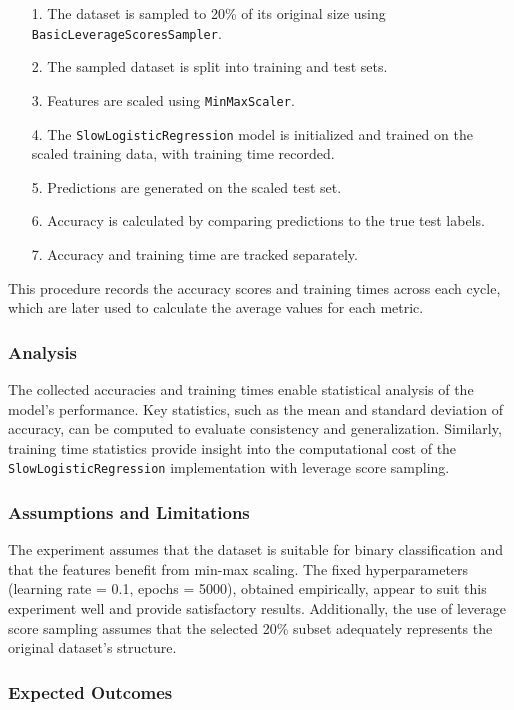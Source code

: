 \documentclass{article}
\theoremstyle{plain}
\theoremstyle{definition}
\theoremstyle{remark}
\begin{document}
\begin{itemize}
 \item [1.] The dataset is sampled to 20\% of its original size using \texttt{BasicLeverageScoresSampler}.
 \item [2.] The sampled dataset is split into training and test sets.
 \item [3.] Features are scaled using \texttt{MinMaxScaler}.
 \item [4.] The \texttt{SlowLogisticRegression} model is initialized and trained on the scaled training data, with training time recorded.
 \item [5.] Predictions are generated on the scaled test set.
 \item [6.] Accuracy is calculated by comparing predictions to the true test labels.
 \item [7.] Accuracy and training time are tracked separately.
\end{itemize}

This procedure records the accuracy scores and training times across each cycle, which are later used to calculate the average values for each metric.

\subsubsection{Analysis}

The collected accuracies and training times enable statistical analysis of the model's performance. Key statistics, such as the mean and standard deviation of accuracy, can be computed to evaluate consistency and generalization. Similarly, training time statistics provide insight into the computational cost of the \texttt{SlowLogisticRegression} implementation with leverage score sampling.

\subsubsection{Assumptions and Limitations}

The experiment assumes that the dataset is suitable for binary classification and that the features benefit from min-max scaling. The fixed hyperparameters (learning rate = 0.1, epochs = 5000), obtained empirically, appear to suit this experiment well and provide satisfactory results. Additionally, the use of leverage score sampling assumes that the selected 20\% subset adequately represents the original dataset's structure.

\subsubsection{Expected Outcomes}
\end{document}
